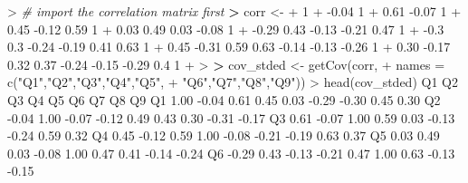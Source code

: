 \documentclass[
]{article}
\newenvironment{Shaded}{\begin{snugshade}}{\end{snugshade}}
\newcommand{\AttributeTok}[1]{\textcolor[rgb]{0.77,0.63,0.00}{#1}}
\newcommand{\CommentTok}[1]{\textcolor[rgb]{0.56,0.35,0.01}{\textit{#1}}}
\newcommand{\ErrorTok}[1]{\textcolor[rgb]{0.64,0.00,0.00}{\textbf{#1}}}
\newcommand{\FloatTok}[1]{\textcolor[rgb]{0.00,0.00,0.81}{#1}}
\newcommand{\FunctionTok}[1]{\textcolor[rgb]{0.00,0.00,0.00}{#1}}
\newcommand{\NormalTok}[1]{#1}
\newcommand{\OtherTok}[1]{\textcolor[rgb]{0.56,0.35,0.01}{#1}}
\newcommand{\SpecialCharTok}[1]{\textcolor[rgb]{0.00,0.00,0.00}{#1}}
\newcommand{\StringTok}[1]{\textcolor[rgb]{0.31,0.60,0.02}{#1}}
\begin{document}
\begin{Shaded}
\begin{Highlighting}[]
\SpecialCharTok{\textgreater{}} \CommentTok{\# import the correlation matrix first}
\ErrorTok{\textgreater{}}\NormalTok{ corr }\OtherTok{\textless{}{-}} \StringTok{\textquotesingle{}}
\StringTok{+ 1}
\StringTok{+ {-}0.04 1}
\StringTok{+ 0.61  {-}0.07 1}
\StringTok{+ 0.45  {-}0.12 0.59  1}
\StringTok{+ 0.03  0.49  0.03  {-}0.08 1}
\StringTok{+ {-}0.29 0.43  {-}0.13 {-}0.21 0.47  1}
\StringTok{+ {-}0.3  0.3 {-}0.24 {-}0.19 0.41  0.63  1}
\StringTok{+ 0.45  {-}0.31 0.59  0.63  {-}0.14 {-}0.13 {-}0.26 1}
\StringTok{+ 0.30  {-}0.17 0.32  0.37  {-}0.24 {-}0.15 {-}0.29 0.4 1}
\StringTok{+ \textquotesingle{}}
\SpecialCharTok{\textgreater{}} 
\ErrorTok{\textgreater{}}\NormalTok{ cov\_stded }\OtherTok{\textless{}{-}} \FunctionTok{getCov}\NormalTok{(corr,}
\SpecialCharTok{+}                     \AttributeTok{names =} \FunctionTok{c}\NormalTok{(}\StringTok{"Q1"}\NormalTok{,}\StringTok{"Q2"}\NormalTok{,}\StringTok{"Q3"}\NormalTok{,}\StringTok{"Q4"}\NormalTok{,}\StringTok{"Q5"}\NormalTok{,}
\SpecialCharTok{+}                               \StringTok{"Q6"}\NormalTok{,}\StringTok{"Q7"}\NormalTok{,}\StringTok{"Q8"}\NormalTok{,}\StringTok{"Q9"}\NormalTok{))}
\SpecialCharTok{\textgreater{}} \FunctionTok{head}\NormalTok{(cov\_stded)}
\NormalTok{      Q1    Q2    Q3    Q4    Q5    Q6    Q7    Q8    Q9}
\NormalTok{Q1  }\FloatTok{1.00} \SpecialCharTok{{-}}\FloatTok{0.04}  \FloatTok{0.61}  \FloatTok{0.45}  \FloatTok{0.03} \SpecialCharTok{{-}}\FloatTok{0.29} \SpecialCharTok{{-}}\FloatTok{0.30}  \FloatTok{0.45}  \FloatTok{0.30}
\NormalTok{Q2 }\SpecialCharTok{{-}}\FloatTok{0.04}  \FloatTok{1.00} \SpecialCharTok{{-}}\FloatTok{0.07} \SpecialCharTok{{-}}\FloatTok{0.12}  \FloatTok{0.49}  \FloatTok{0.43}  \FloatTok{0.30} \SpecialCharTok{{-}}\FloatTok{0.31} \SpecialCharTok{{-}}\FloatTok{0.17}
\NormalTok{Q3  }\FloatTok{0.61} \SpecialCharTok{{-}}\FloatTok{0.07}  \FloatTok{1.00}  \FloatTok{0.59}  \FloatTok{0.03} \SpecialCharTok{{-}}\FloatTok{0.13} \SpecialCharTok{{-}}\FloatTok{0.24}  \FloatTok{0.59}  \FloatTok{0.32}
\NormalTok{Q4  }\FloatTok{0.45} \SpecialCharTok{{-}}\FloatTok{0.12}  \FloatTok{0.59}  \FloatTok{1.00} \SpecialCharTok{{-}}\FloatTok{0.08} \SpecialCharTok{{-}}\FloatTok{0.21} \SpecialCharTok{{-}}\FloatTok{0.19}  \FloatTok{0.63}  \FloatTok{0.37}
\NormalTok{Q5  }\FloatTok{0.03}  \FloatTok{0.49}  \FloatTok{0.03} \SpecialCharTok{{-}}\FloatTok{0.08}  \FloatTok{1.00}  \FloatTok{0.47}  \FloatTok{0.41} \SpecialCharTok{{-}}\FloatTok{0.14} \SpecialCharTok{{-}}\FloatTok{0.24}
\NormalTok{Q6 }\SpecialCharTok{{-}}\FloatTok{0.29}  \FloatTok{0.43} \SpecialCharTok{{-}}\FloatTok{0.13} \SpecialCharTok{{-}}\FloatTok{0.21}  \FloatTok{0.47}  \FloatTok{1.00}  \FloatTok{0.63} \SpecialCharTok{{-}}\FloatTok{0.13} \SpecialCharTok{{-}}\FloatTok{0.15}
\end{Highlighting}
\end{Shaded}
\end{document}
